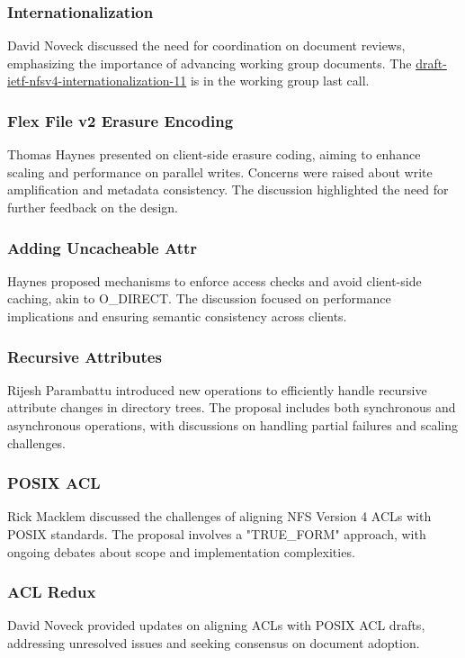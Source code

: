 \documentclass{article}
\begin{document}
\subsubsection{Internationalization}
David Noveck discussed the need for coordination on document reviews, emphasizing the importance of advancing working group documents. The \href{https://datatracker.ietf.org/doc/html/draft-ietf-nfsv4-internationalization-11}{draft-ietf-nfsv4-internationalization-11} is in the working group last call.

\subsubsection{Flex File v2 Erasure Encoding}
Thomas Haynes presented on client-side erasure coding, aiming to enhance scaling and performance on parallel writes. Concerns were raised about write amplification and metadata consistency. The discussion highlighted the need for further feedback on the design.

\subsubsection{Adding Uncacheable Attr}
Haynes proposed mechanisms to enforce access checks and avoid client-side caching, akin to O\_DIRECT. The discussion focused on performance implications and ensuring semantic consistency across clients.

\subsubsection{Recursive Attributes}
Rijesh Parambattu introduced new operations to efficiently handle recursive attribute changes in directory trees. The proposal includes both synchronous and asynchronous operations, with discussions on handling partial failures and scaling challenges.

\subsubsection{POSIX ACL}
Rick Macklem discussed the challenges of aligning NFS Version 4 ACLs with POSIX standards. The proposal involves a "TRUE\_FORM" approach, with ongoing debates about scope and implementation complexities.

\subsubsection{ACL Redux}
David Noveck provided updates on aligning ACLs with POSIX ACL drafts, addressing unresolved issues and seeking consensus on document adoption.
\end{document}
